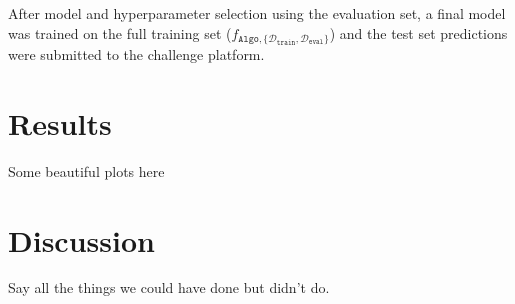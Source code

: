 \documentclass[10pt,conference,compsocconf]{IEEEtran}
\newcommand{\Deval}{\mathcal{D}_{\mathtt{eval}}}
\newcommand{\Dtrain}{\mathcal{D}_{\mathtt{train}}}
\newcommand{\classifier}[2]{f_{#1, #2}}
\newcommand{\Train}{\mathtt{Algo}}
\begin{document}
After model and hyperparameter selection using the evaluation set, a final model was trained on the full training set
($\classifier{\Train}{\{ \Dtrain, \Deval\}}$) and the test set predictions were submitted to the challenge platform. 

\section{Results}
Some beautiful plots here

\section{Discussion}
Say all the things we could have done but didn't do.



\end{document}
